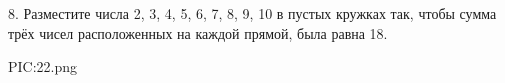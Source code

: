 8. Разместите числа 2, 3, 4, 5, 6, 7, 8, 9, 10 в пустых кружках так, чтобы сумма трёх чисел расположенных на каждой прямой, была равна 18.
\begin{center}
{{PIC:22.png}}
\end{center}
